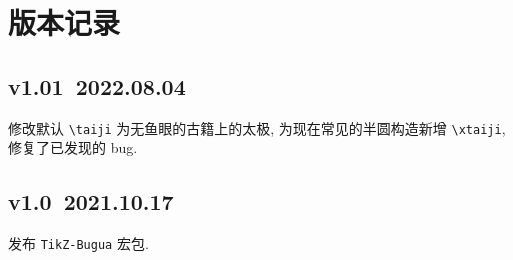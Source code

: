 \documentclass{article}
\begin{document}
\section{版本记录}
\subsection*{v1.01~2022.08.04}
修改默认 \verb+\taiji+ 为无鱼眼的古籍上的太极, 为现在常见的半圆构造新增 \verb+\xtaiji+, 修复了已发现的 bug.

\subsection*{v1.0~2021.10.17}
发布 \verb+TikZ-Bugua+ 宏包.

\printindex
\end{document}
